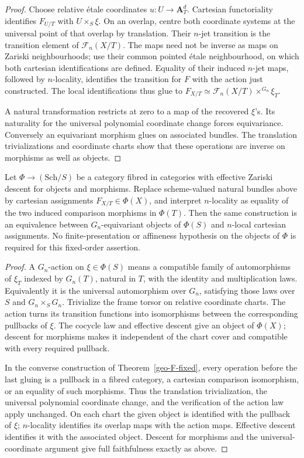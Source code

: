 \begin{proof}
Choose relative \'{e}tale coordinates $u:U\to\mathbf A^d_T$. Cartesian
functoriality identifies $F_{U/T}$ with $U\times_S\xi$. On an overlap,
centre both coordinate systems at the universal point of that overlap by
translation. Their $n$-jet transition is the transition element of
$\mathcal F_n(X/T)$. The maps need not be inverse as maps on Zariski
neighbourhoods; use their common pointed \'{e}tale neighbourhood, on which
both cartesian identifications are defined. Equality of their induced
$n$-jet maps, followed by $n$-locality, identifies the transition for $F$
with the action just constructed. The local identifications thus glue to
$F_{X/T}\simeq\mathcal F_n(X/T)\times^{G_n}\xi_T$.

A natural transformation restricts at zero to a map of the recovered
$\xi$'s. Its naturality for the universal polynomial coordinate change
forces equivariance. Conversely an equivariant morphism glues on associated
bundles. The translation trivializations and coordinate charts show that
these operations are inverse on morphisms as well as objects.
\end{proof}

\begin{corollary}
\label{geo-F-categorical}
Let $\Phi\to(\mathrm{Sch}/S)$ be a category fibred in categories with
effective Zariski descent for objects and morphisms. Replace scheme-valued
natural bundles above by cartesian assignments $F_{X/T}\in\Phi(X)$, and
interpret $n$-locality as equality of the two induced comparison morphisms
in $\Phi(T)$. Then the same construction is an equivalence between
$G_n$-equivariant objects of $\Phi(S)$ and $n$-local cartesian assignments.
No finite-presentation or affineness hypothesis on the objects of $\Phi$
is required for this fixed-order assertion.
\end{corollary}
\begin{proof}
A $G_n$-action on $\xi\in\Phi(S)$ means a compatible family of
automorphisms of $\xi_T$ indexed by $G_n(T)$, natural in $T$, with the
identity and multiplication laws. Equivalently it is the universal
automorphism over $G_n$, satisfying those laws over $S$ and $G_n\times_SG_n$.
Trivialize the frame torsor on relative coordinate charts. The action turns
its transition functions into isomorphisms between the corresponding
pullbacks of $\xi$. The cocycle law and effective descent give an object
of $\Phi(X)$; descent for morphisms makes it independent of the chart
cover and compatible with every required pullback.

In the converse construction of Theorem~\ref{geo-F-fixed}, every operation
before the last gluing is a pullback in a fibred category, a cartesian
comparison isomorphism, or an equality of such morphisms. Thus the
translation trivialization, the universal polynomial coordinate change,
and the verification of the action law apply unchanged. On each chart the
given object is identified with the pullback of $\xi$; $n$-locality
identifies its overlap maps with the action maps. Effective descent
identifies it with the associated object. Descent for morphisms and the
universal-coordinate argument give full faithfulness exactly as above.
\end{proof}

